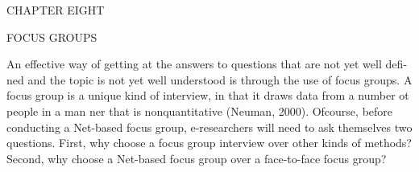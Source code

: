 \documentclass[a4 paper,12pt]{article}\usepackage{xepersian}
\begin{document}
\begin{latin}
\vspace{0.1cm}

\vspace{0.1cm}
\vspace{0.1cm}

\vspace{0.1cm}

                CHAPTER EIGHT

\vspace{0.1cm}

\vspace{0.1cm}
\vspace{0.1cm}

\vspace{0.1cm}

                  FOCUS GROUPS

\vspace{0.1cm}

\vspace{0.1cm}
\vspace{0.1cm}

\vspace{0.1cm}
\vspace{0.1cm}


\noindent
                 An effective way of getting at the answers to questions that are not yet  well defined and the topic is not yet  well understood is through the use of focus groups. A focus group is a unique kind of interview,  in that it draws  data from a number ot people in a man­  ner that is nonquantitative (Neuman, 2000). Ofcourse, before conducting a Net-based focus group, e-researchers will need to ask themselves two questions. First, why choose a focus group interview over other kinds of methods? Second, why choose a Net-based focus group over a face-to-face focus group?
\vspace{0.1cm}

\vspace{0.1cm}
\vspace{0.1cm}

\vspace{0.1cm}
\vspace{0.1cm}



\end{latin}
\end{document}
